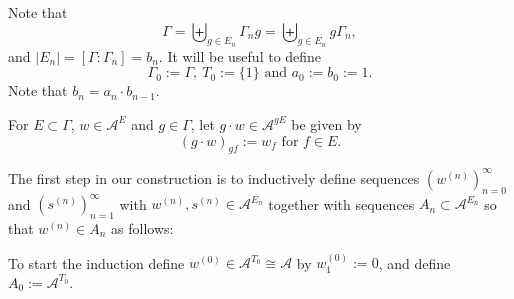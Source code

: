 \documentclass[oneside,english]{amsart}
\theoremstyle{definition}
\newcommand{\AAA}{\mathcal{A}}
\newcommand{\ZZ}{\mathbb{Z}}
\newcommand{\NN}{\mathbb{N}}
\newcommand{\FF}{\mathbb{F}}
\begin{document}
Note that
\begin{equation}\label{eq:G_n_E_n}
 \Gamma= \biguplus_{g \in E_n} \Gamma_{n}g= \biguplus_{g \in E_n} g\Gamma_{n},
\end{equation}
and $|E_n| = [\Gamma:\Gamma_{n}] = b_{n}$.
It will be useful to define
\begin{equation}
\Gamma_0 := \Gamma,~ T_0:= \{1\}\mbox{  and } a_0:= b_0 := 1.
\end{equation}
Note that $b_n = a_n \cdot b_{n-1}$.

For $E \subset \Gamma$, $w \in \AAA^E$ and $g \in \Gamma$, let $g \cdot w \in \AAA^{gE}$ be given by
\begin{equation}
 (g \cdot w)_{ g f}:= w_f \mbox{ for } f \in E.
\end{equation}


The first step in our construction is to  inductively define  sequences $(w^{(n)})_{n=0}^\infty$ and $(s^{(n)})_{n=1}^\infty$  with $w^{(n)},s^{(n)} \in \AAA^{E_n}$ together with  sequences $A_n \subset \AAA^{E_n}$ so that $w^{(n)} \in A_n$ as follows:

To start the induction define
$w^{(0)} \in \AAA^{T_0} \cong \AAA$  by $w^{(0)}_1 := 0$, and  define $A_0 := \AAA^{T_0}$.

\end{document}
